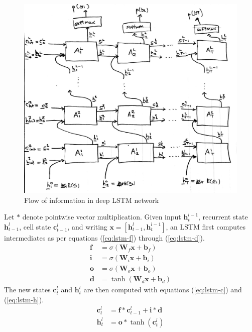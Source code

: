 \documentclass[12pt,a4paper,twoside,openright]{report}
\newcommand{\vect}[1]{\boldsymbol{\mathbf{#1}}}
\begin{document}
\begin{figure}[H]
\centering
\includegraphics[width=400pt]{figs/lstm_net_tmp.jpg}
\caption{Flow of information in deep LSTM network}
\label{fig:deep-lstm-arch}
\end{figure}

Let $\ast$ denote pointwise vector multiplication. Given input
$\vect{h}_t^{l-1}$, recurrent state $\vect{h}_{t-1}^l$, cell state
$\vect{c}_{t-1}^l$, and writing $\vect{x} = [\vect{h}_{t-1}^l,
\vect{h}_t^{l-1}]$, an LSTM first computes intermediates as per equations
(\ref{eq:lstm-f}) through (\ref{eq:lstm-d}).
\begin{align}
  \vect{f} &= \sigma(\vect{W}_f \vect{x} + \vect{b}_f) \label{eq:lstm-f} \\
  \vect{i} &= \sigma(\vect{W}_i \vect{x} + \vect{b}_i) \\
  \vect{o} &= \sigma(\vect{W}_o \vect{x} + \vect{b}_o) \\
  \vect{d} &= \tanh(\vect{W}_d \vect{x} + \vect{b}_d) \label{eq:lstm-d}
\end{align}
The new states $\vect{c}_t^l$ and $\vect{h}_t^l$ are then computed with
equations (\ref{eq:lstm-c}) and (\ref{eq:lstm-h}). 
\begin{align}
  \vect{c}_t^l &= \vect{f} \ast \vect{c}_{t-1}^l + \vect{i} \ast \vect{d}
  \label{eq:lstm-c} \\
  \vect{h}_t^l &= \vect{o} \ast \tanh(\vect{c}_t^l) \label{eq:lstm-h}
\end{align}
\end{document}
